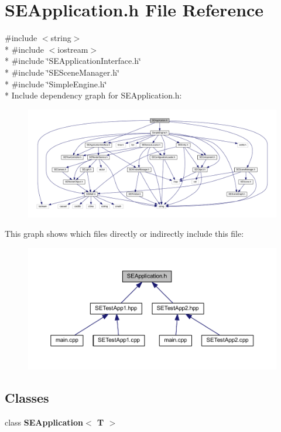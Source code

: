 \section{S\+E\+Application.\+h File Reference}
\label{_s_e_application_8h}
{\ttfamily \#include $<$string$>$}\\*
{\ttfamily \#include $<$iostream$>$}\\*
{\ttfamily \#include \char`\"{}S\+E\+Application\+Interface.\+h\char`\"{}}\\*
{\ttfamily \#include \char`\"{}S\+E\+Scene\+Manager.\+h\char`\"{}}\\*
{\ttfamily \#include \char`\"{}Simple\+Engine.\+h\char`\"{}}\\*
Include dependency graph for S\+E\+Application.\+h\+:
\nopagebreak
\begin{figure}[H]
\begin{center}
\leavevmode
\includegraphics[width=350pt]{_s_e_application_8h__incl}
\end{center}
\end{figure}
This graph shows which files directly or indirectly include this file\+:
\nopagebreak
\begin{figure}[H]
\begin{center}
\leavevmode
\includegraphics[width=350pt]{_s_e_application_8h__dep__incl}
\end{center}
\end{figure}
\subsection*{Classes}
\begin{DoxyCompactItemize}
\item 
class {\bf S\+E\+Application$<$ T $>$}
\end{DoxyCompactItemize}
